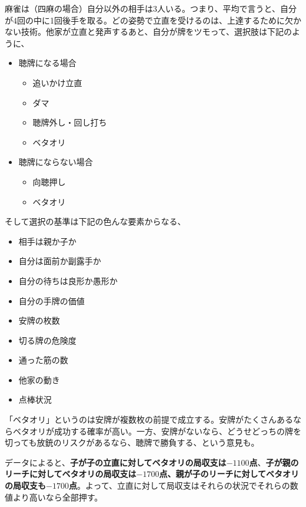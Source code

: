 \documentclass[../nankiru_main.tex]{subfiles}
\begin{document}

麻雀は（四麻の場合）自分以外の相手は3人いる。つまり、平均で言うと、自分が4回の中に1回後手を取る。どの姿勢で立直を受けるのは、上達するために欠かない技術。他家が立直と発声するあと、自分が牌をツモって、選択肢は下記のように、

\begin{itemize}
  \item 聴牌になる場合
  \begin{itemize}
    \item 追いかけ立直
    \item ダマ
    \item 聴牌外し・回し打ち
    \item ベタオリ
  \end{itemize}
  \item 聴牌にならない場合
  \begin{itemize}
    \item 向聴押し
    \item ベタオリ
  \end{itemize}
\end{itemize}

そして選択の基準は下記の色んな要素からなる、

\begin{itemize}
  \item 相手は親か子か
  \item 自分は面前か副露手か
  \item 自分の待ちは良形か愚形か
  \item 自分の手牌の価値
  \item 安牌の枚数
  \item 切る牌の危険度
  \item 通った筋の数
  \item 他家の動き
  \item 点棒状況
\end{itemize}

「ベタオリ」というのは安牌が複数枚の前提で成立する。安牌がたくさんあるならベタオリが成功する確率が高い。一方、安牌がないなら、どうせどっちの牌を切っても放銃のリスクがあるなら、聴牌で勝負する、という意見も。

データによると、\textbf{子が子の立直に対してベタオリの局収支は$-1100$点}\citep[][p. 83]{miinin-stat}、\textbf{子が親のリーチに対してベタオリの局収支は$-1700$点、親が子のリーチに対してベタオリの局収支も$-1700$点}\citep[][p. 84]{miinin-stat}。よって、立直に対して局収支はそれらの状況でそれらの数値より高いなら全部押す。
\end{document}
